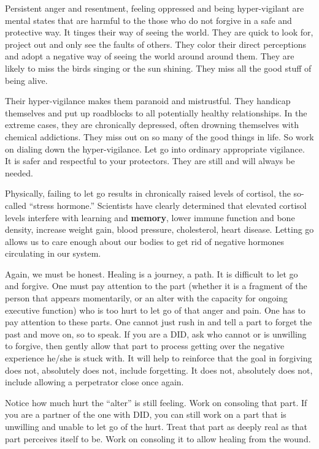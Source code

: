 \documentclass[]{book}
\begin{document}
Persistent anger and resentment, feeling oppressed and being hyper-vigilant are mental states that are harmful to the those who do not forgive in a safe and protective way. It tinges their way of seeing the world. They are quick to look for, project out and only see the faults of others. They color their direct perceptions and adopt a negative way of seeing the world around around them. They are likely to miss the birds singing or the sun shining. They miss all the good stuff of being alive.

Their hyper-vigilance makes them paranoid and mistrustful. They handicap themselves and put up roadblocks to all potentially healthy relationships. In the extreme cases, they are chronically depressed, often drowning themselves with chemical addictions. They miss out on so many of the good things in life. So work on dialing down the hyper-vigilance. Let go into ordinary appropriate vigilance. It is safer and respectful to your protectors. They are still and will always be needed.

Physically, failing to let go results in chronically raised levels of cortisol, the so-called ``stress hormone.'' Scientists have clearly determined that elevated cortisol levels interfere with learning and \textbf{memory}, lower immune function and bone density, increase weight gain, blood pressure, cholesterol, heart disease. Letting go allows us to care enough about our bodies to get rid of negative hormones circulating in our system.

Again, we must be honest. Healing is a journey, a path. It is difficult to let go and forgive. One must pay attention to the part (whether it is a fragment of the person that appears momentarily, or an alter with the capacity for ongoing executive function) who is too hurt to let go of that anger and pain. One has to pay attention to these parts. One cannot just rush in and tell a part to forget the past and move on, so to speak. If you are a DID, ask who cannot or is unwilling to forgive, then gently allow that part to process getting over the negative experience he/she is stuck with. It will help to reinforce that the goal in forgiving does not, absolutely does not, include forgetting. It does not, absolutely does not, include allowing a perpetrator close once again.

Notice how much hurt the ``alter'' is still feeling. Work on consoling that part. If you are a partner of the one with DID, you can still work on a part that is unwilling and unable to let go of the hurt. Treat that part as deeply real as that part perceives itself to be. Work on consoling it to allow healing from the wound.
\end{document}
